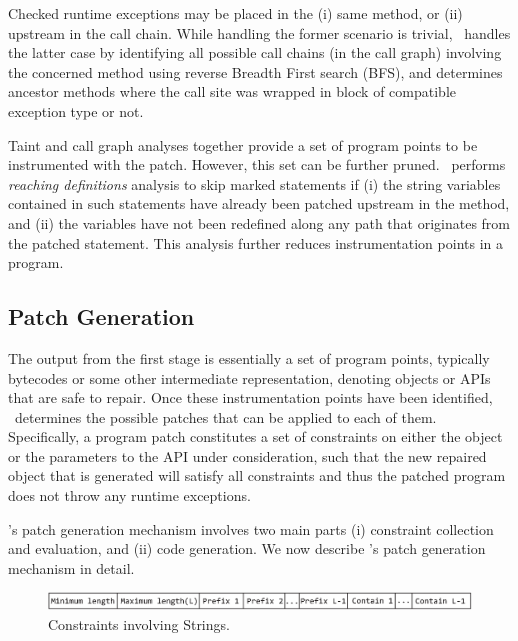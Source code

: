 Checked runtime exceptions may be placed in the (i) same method, or (ii)
upstream in the call chain. While handling the former scenario is trivial,
\tool\ handles the latter case by identifying all possible call chains (in
the call graph) involving the concerned method using reverse Breadth First
search (BFS), and determines ancestor methods where the call site was wrapped in
 block of compatible exception type or not.

 Taint and call graph analyses
together provide a set of program points to be instrumented with the
patch. However, this set can be further pruned. \tool\ performs \textit{reaching
definitions} analysis to skip marked statements if
(i) the string variables contained in such statements have already been patched
upstream in the method, and (ii) the variables have not been redefined along any
path that originates from the patched statement. This analysis further reduces
instrumentation points in a program.

\subsection{Patch Generation}
\label{sec:tool:stage2}

The output from the first stage is essentially a set of program points,
typically bytecodes or some other intermediate representation, denoting
 objects or APIs that are safe to repair. Once these
instrumentation points have been identified, \tool\ determines the
possible patches that can be applied to each of them. Specifically, a program
patch constitutes a set of constraints on either the  object or the
parameters to the  API under consideration, such that the new
repaired  object that is generated will satisfy all constraints and
thus the patched program does not throw any runtime exceptions.

\tool's patch generation mechanism involves two main parts (i) constraint
collection and evaluation, and (ii) code generation. We now describe \tool's
patch generation mechanism in detail. 

\begin{figure}[t]
\centering
\includegraphics[width=\linewidth]{images/constraint.eps}
\caption{Constraints involving Strings.}
\label{fig:constraint}
\end{figure}

